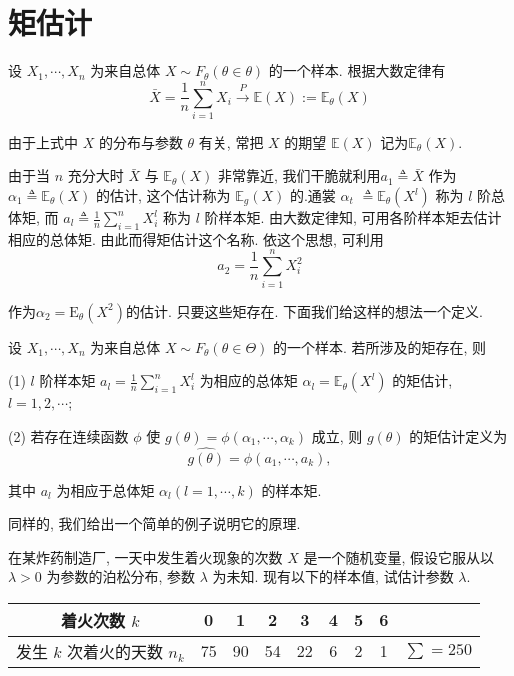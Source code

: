 \section{矩估计}

设 $X_1, \cdots, X_n$ 为来自总体 $X \sim F_\theta(\theta \in \theta)$ 的一个样本. 根据大数定律有
$$\bar{X}=\frac{1}{n} \sum_{i=1}^n X_i \stackrel{P}{\longrightarrow} \mathbb{E}(X) := \mathbb{E}_\theta(X)$$

由于上式中 $X$ 的分布与参数 $\theta$ 有关, 常把 $X$ 的期望 $\mathbb{E}(X)$ 记为$\mathbb{E}_\theta(X)$. 

由于当 $n$ 充分大时 $\bar{X}$ 与 $\mathbb{E}_\theta(X)$ 非常靠近, 我们干脆就利用$a_1 \triangleq \bar{X}$ 作为 $\alpha_1 \triangleq \mathbb{E}_\theta(X)$ 的估计, 这个估计称为 $\mathbb{E}_g(X)$ 的.通裳 $\alpha_t$ $\triangleq \mathbb{E}_\theta\left(X^l\right)$ 称为 $l$ 阶总体矩, 而 $a_l \triangleq \frac{1}{n} \sum_{i=1}^n X_i^l$ 称为 $l$ 阶样本矩. 由大数定律知, 可用各阶样本矩去估计相应的总体矩. 由此而得矩估计这个名称. 依这个思想, 可利用
$$
a_2=\frac{1}{n} \sum_{i=1}^n X_i^2
$$

作为$\alpha_2 =\mathrm E_\theta ({X^2})$的估计. 只要这些矩存在. 下面我们给这样的想法一个定义. 

\begin{definition}
    设 $X_1, \cdots, X_n$ 为来自总体 $X \sim F_\theta(\theta \in \Theta)$ 的一个样本. 若所涉及的矩存在, 则

(1) $l$ 阶样本矩 $a_l=\frac{1}{n} \sum_{i=1}^n X_i^l$ 为相应的总体矩 $\alpha_l=\mathbb{E}_\theta\left(X^l\right)$ 的矩估计, $l=1,2, \cdots$;


(2) 若存在连续函数 $\phi$ 使 $g(\theta)=\phi\left(\alpha_1, \cdots, \alpha_k\right)$ 成立, 则 $g(\theta)$ 的矩估计定义为
$$
\widehat{g(\theta)}=\phi\left(a_1, \cdots, a_k\right),
$$

其中 $a_l$ 为相应于总体矩 $\alpha_l(l=1, \cdots, k)$ 的样本矩.
\end{definition}

同样的, 我们给出一个简单的例子说明它的原理. 
\begin{example}
    在某炸药制造厂, 一天中发生着火现象的次数 $X$ 是一个随机变量, 假设它服从以 $\lambda>0$ 为参数的泊松分布, 参数 $\lambda$ 为未知. 现有以下的样本值, 试估计参数 $\lambda$.

\begin{tabular}{c|ccccccc|c} 
    着火次数 $k$ & 0 & 1 & 2 & 3 & 4 & 5 & 6 & \\
    \hline 发生 $k$ 次着火的天数 $n_k$ & 75 & 90 & 54 & 22 & 6 & 2 & 1 & $\sum=250$
    \end{tabular}
\end{example}

